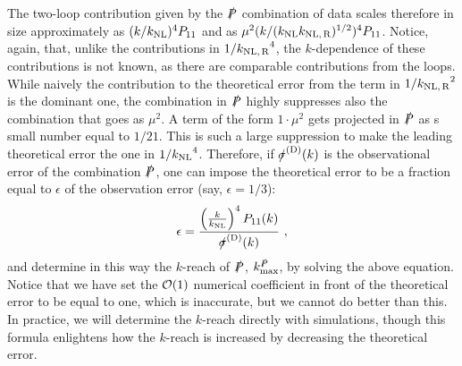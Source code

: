 \documentclass[12pt,a4paper]{article}
\def\PA{\slashed{P}}
\renewcommand{\(}{\left(}
\renewcommand{\)}{\right)}
\def\be{\begin{equation}}
\def\ee{\end{equation}}
\def\knl{{k_{\rm NL}}}
\def\knlr{{k_{\rm NL,\,R}}}
\begin{document}
The two-loop contribution given by  the $\PA$ combination of data scales therefore in size approximately as $(k/\knl)^4P_{11}$ and as $\mu^2(k/(\knl \knlr)^{1/2})^4 P_{11}$. Notice, again, that, unlike the contributions in $1/\knlr^4$, the $k$-dependence of these {contributions}  is not known, as there are comparable contributions from the loops. While naively the contribution to the theoretical error from the term in $1/\knlr^2$ is the dominant one, the combination in $\PA$ highly suppresses also the combination that goes as $\mu^2$. A term of the form $1\cdot\mu^2$ gets projected in $\PA$ as s small number equal to $1/21$. This is such a large suppression to make the leading theoretical error the one in $1/\knl^4$. Therefore, if $\slashed{\sigma}^{\rm (D)}(k)$ is the observational error of the combination $\PA$, one can impose the theoretical error to be a fraction equal to $\epsilon$ of the observation error (say, $\epsilon=1/3$):
\be
\epsilon=\frac{\left(\frac{k}{\knl}\right)^4 P_{11}(k)}{\slashed{\sigma}^{\rm (D)}(k)}\ ,
\ee 
and determine in this way the $k$-reach of $\PA$, $k_{\rm max}^\slashed{P}$, by solving the above equation. Notice that we have set the ${\cal{O}}(1)$ numerical coefficient in front of the theoretical error to be equal to one, which is inaccurate, but we cannot do better than this. In practice, we will determine the $k$-reach directly with simulations, though this formula enlightens how the $k$-reach is increased by decreasing the theoretical error. 
 
\end{document}
